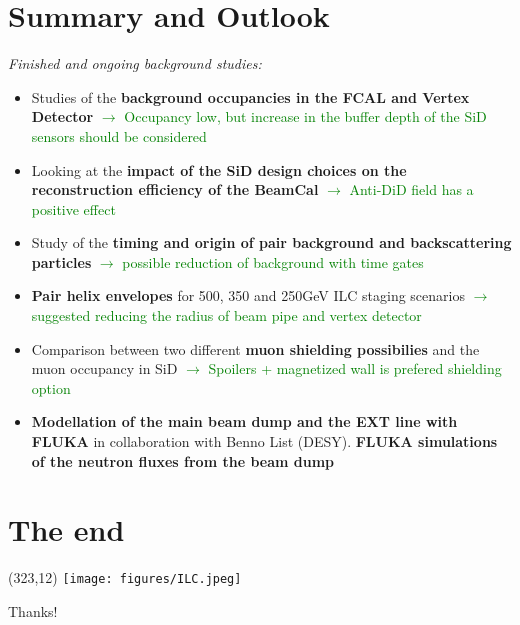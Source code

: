 \documentclass[xcolor={dvipsnames}]{beamer}
\newcommand{\ilclogo}{
  \setlength{\TPHorizModule}{1pt}
  \setlength{\TPVertModule}{1pt}
  \begin{textblock}{1}(323,12)
   \texttt{[image: figures/ILC.jpeg]}
  \end{textblock}
}
\begin{document}
\section{Summary and Outlook}
\begin{frame}
\textit{Finished and ongoing background studies:}
 \begin{itemize} 
  \item Studies of the \textbf{background occupancies in the FCAL and Vertex Detector} \textcolor{Green}{$\rightarrow$ Occupancy low, but increase in the buffer depth of the SiD sensors should be considered}
  \item Looking at the \textbf{impact of the SiD design choices on the reconstruction efficiency of the BeamCal} \textcolor{Green}{$\rightarrow$ Anti-DiD field has a positive effect}
  \item Study of the \textbf{timing and origin of pair background and backscattering particles} \textcolor{Green}{$\rightarrow$ possible reduction of background with time gates}
  \item \textbf{Pair helix envelopes} for 500, 350 and 250GeV ILC staging scenarios \textcolor{Green}{$\rightarrow$ suggested reducing the radius of beam pipe and vertex detector}
  \item Comparison between two different \textbf{muon shielding possibilies} and the muon occupancy in SiD \textcolor{Green}{$\rightarrow$ Spoilers + magnetized wall is prefered shielding option}
   \item \textbf{Modellation of the main beam dump and the EXT line with FLUKA} in collaboration with Benno List (DESY). \textbf{FLUKA simulations of the neutron fluxes from the beam dump}
 \end{itemize}
\end{frame}


\section*{The end}
{
\begin{frame}
\ilclogo
\begin{center}
\vspace*{1cm}
\textcolor{RubineRed}{
	\LARGE Thanks!
}
\end{center}
\end{frame}
}
\end{document}
